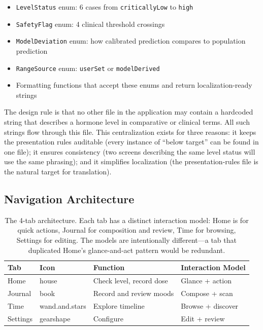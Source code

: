 \documentclass[11pt,a4paper]{article}
\newcommand{\code}[1]{\texttt{\small #1}}
\begin{document}
\begin{itemize}[nosep,leftmargin=1.4em]
\item \code{LevelStatus} enum: 6 cases from \code{criticallyLow} to
  \code{high}
\item \code{SafetyFlag} enum: 4 clinical threshold crossings
\item \code{ModelDeviation} enum: how calibrated prediction compares to
  population prediction
\item \code{RangeSource} enum: \code{userSet} or \code{modelDerived}
\item Formatting functions that accept these enums and return
  localization-ready strings
\end{itemize}

The design rule is that no other file in the application may contain a
hardcoded string that describes a hormone level in comparative or
clinical terms. All such strings flow through this file. This
centralization exists for three reasons: it keeps the presentation rules
auditable (every instance of ``below target'' can be found in one file);
it ensures consistency (two screens describing the same level status will
use the same phrasing); and it simplifies localization (the
presentation-rules file is the natural target for translation).

\subsection{Navigation Architecture}
\label{sec:navigation}

\begin{table}[h]
\centering
\small
\begin{tabular}{@{}llll@{}}
\toprule
\textbf{Tab} & \textbf{Icon} & \textbf{Function} & \textbf{Interaction Model} \\
\midrule
Home    & house          & Check level, record dose & Glance + action \\
Journal & book           & Record and review moods  & Compose + scan \\
Time    & wand.and.stars & Explore timeline         & Browse + discover \\
Settings& gearshape      & Configure                & Edit + review \\
\bottomrule
\end{tabular}
\caption{The 4-tab architecture. Each tab has a distinct interaction
model: Home is for quick actions, Journal for composition and review,
Time for browsing, Settings for editing. The models are intentionally
different---a tab that duplicated Home's glance-and-act pattern would be
redundant.}
\label{tab:tabs}
\end{table}
\end{document}
